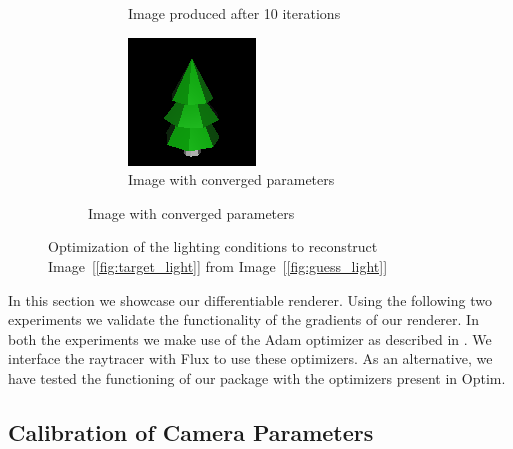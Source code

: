 \documentclass{juliacon}
\begin{document}
\begin{figure}[!htb]
\begin{subfigure}[b]{0.45\textwidth}
\begin{subfigure}[b]{0.4\textwidth}
            \caption{Image produced after 10 iterations}
        \end{subfigure}
        \hfill
        \begin{subfigure}[b]{0.4\textwidth}
            \centering
            \includegraphics[width=\textwidth]{images/light/501.png}
            \caption{Image with converged parameters}
        \end{subfigure}
    \end{subfigure}
    \caption{Optimization of the lighting conditions to reconstruct Image~[\ref{fig:target_light}] from Image~[\ref{fig:guess_light}]}
    \label{fig:light_position}
\end{figure}

In this section we showcase our differentiable renderer. Using the following two experiments we validate the functionality of the gradients of our renderer. In both the experiments we make use of the Adam optimizer as described in \cite{kingma2014adam}. We interface the raytracer with Flux to use these optimizers. As an alternative, we have tested the functioning of our package with the optimizers present in Optim.

\subsection{\textbf{Calibration of Camera Parameters}}
\end{document}
